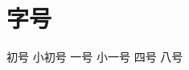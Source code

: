 \documentclass[UTF8]{ctexart}
\begin{document}
    \section{字号}
        { 初号}\newline
        { 小初号}\newline
        { 一号}\newline
        { 小一号}\newline
        { 四号}\newline
        { 八号}\newline
\end{document}
